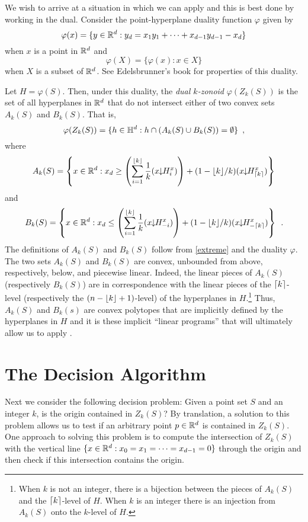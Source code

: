 \documentclass[lotsofwhite]{patmorin}
\newcommand{\drop}{\!\!\downarrow\!\!}
\newcommand{\dual}{\varphi}
\begin{document}
We wish to arrive at a situation in which we can apply 
and this is best done by working in the dual.
Consider the point-hyperplane duality function
$\dual$ given by 
\[
    \dual(x)=\{y\in\R^d : y_d = x_1y_1 +\cdots +x_{d-1}y_{d-1} - x_d \}
\] 
when $x$ is a point in $\mathbb{R}^d$ and
\[
     \dual(X) = \{\dual(x) : x\in X\}
\]
when $X$ is a subset of $\mathbb{R}^d$.  See Edelsbrunner's book \cite{e97}
for properties of this duality. 

Let $H=\dual(S)$.  Then,
under this duality, the \emph{dual $k$-zonoid} $\dual(Z_k(S))$ is the set 
of all hyperplanes in $\mathbb{R}^d$
that do not intersect either of two convex sets $A_k(S)$ and $B_k(S)$.
That is,
\[
     \dual(Z_k(S)) = \{ h\in\Hy^d : h\cap(A_k(S)\cup B_k(S)) = \emptyset \} \enspace ,
\]
where
\begin{equation}
   A_k(S) = \left\{x\in\R^d: x_d \ge 
\left(\sum_{i=1}^{\floor{k}} \frac{1}{k}(x\drop H_i^x)\right) +
          (1-\lfloor k\rfloor/k)(x\drop H_{\ceil{k}}^x) \right\}  \eqlabel{ra}
\end{equation} 
and
\begin{equation}
   B_k(S) = \left\{x\in\R^d: x_d \le 
\left(\sum_{i=1}^{\floor{k}} \frac{1}{k}(x\drop H_{-i}^x)\right) +
          (1-\lfloor k\rfloor/k)(x\drop H_{-\ceil{k}}^x) \right\} \enspace .
\end{equation}
The definitions of $A_k(S)$ and $B_k(S)$ follow from \eqref{extreme}
and the duality $\dual$.  The two sets $A_k(S)$ and $B_k(S)$ are
convex, unbounded from above, respectively, below, and piecewise
linear.  Indeed, the linear pieces of $A_k(S)$ (respectively $B_k(S)$)
are in correspondence with the linear pieces of the
$\left\lceil k \right\rceil$-level (respectively the $(n-\left\lfloor k \right\rfloor+1)$-level) of the
hyperplanes in $H$.\footnote{When $k$ is not an integer, there is a
bijection between the pieces of $A_k(S)$ and the $\left\lceil k \right\rceil$-level of
$H$.  When $k$ is an integer there is an injection from $A_k(S)$ onto
the $k$-level of $H$.}  Thus, $A_k(S)$ and $B_k(s)$ are convex
polytopes that are implicitly defined by the hyperplanes in $H$ and it
is these implicit ``linear programs'' that will ultimately allow us to
apply .


\section{The Decision Algorithm}

Next we consider the following decision problem:  Given a point set
$S$ and an integer $k$, is the origin contained in $Z_k(S)$?  By
translation, a solution to this problem allows us to test if an
arbitrary point $p\in\mathbb{R}^d$ is contained in $Z_k(S)$. One approach to
solving this problem is to compute the intersection of $Z_k(S)$ with
the vertical line $\{x\in\mathbb{R}^d:x_0=x_1=\cdots=x_{d-1}=0\}$ through the
origin and then check if this intersection contains the origin.
\end{document}
